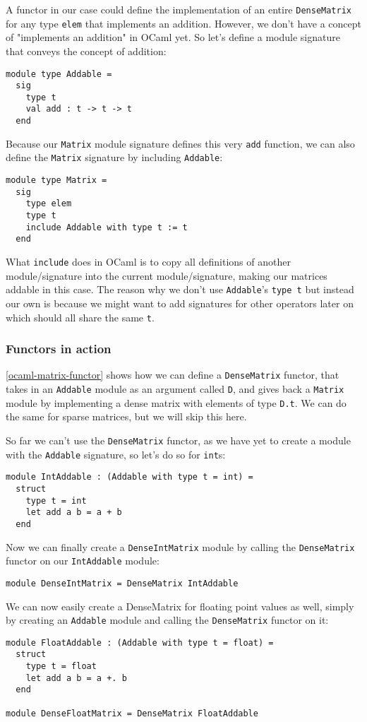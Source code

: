 A functor in our case could define the implementation of an entire \verb|DenseMatrix| for any type \verb|elem| that implements an addition. However, we don't have a concept of "implements an addition" in OCaml yet. So let's define a module signature that conveys the concept of addition:
\begin{verbatim}
module type Addable =
  sig
    type t
    val add : t -> t -> t
  end
\end{verbatim}
Because our \verb|Matrix| module signature defines this very \verb|add| function, we can also define the \verb|Matrix| signature by including \verb|Addable|:
\begin{verbatim}
module type Matrix =
  sig
    type elem
    type t
    include Addable with type t := t
  end
\end{verbatim}
What \verb|include| does in OCaml is to copy all definitions of another module/signature into the current module/signature, making our matrices addable in this case. The reason why we don't use \verb|Addable|'s \verb|type t| but instead our own is because we might want to add signatures for other operators later on which should all share the same \verb|t|.

\subsubsection{Functors in action}

\autoref{ocaml-matrix-functor} shows how we can define a \verb|DenseMatrix| functor, that takes in an \verb|Addable| module as an argument called \verb|D|, and gives back a \verb|Matrix| module by implementing a dense matrix with elements of type \verb|D.t|. We can do the same for sparse matrices, but we will skip this here.

So far we can't use the \verb|DenseMatrix| functor, as we have yet to create a module with the \verb|Addable| signature, so let's do so for \verb|int|s:
\begin{verbatim}
module IntAddable : (Addable with type t = int) =
  struct
    type t = int
    let add a b = a + b
  end
\end{verbatim}

Now we can finally create a \verb|DenseIntMatrix| module by calling the \verb|DenseMatrix| functor on our \verb|IntAddable| module:
\begin{verbatim}
module DenseIntMatrix = DenseMatrix IntAddable
\end{verbatim}

We can now easily create a DenseMatrix for floating point values as well, simply by creating an \verb|Addable| module and calling the \verb|DenseMatrix| functor on it:
\begin{verbatim}
module FloatAddable : (Addable with type t = float) =
  struct
    type t = float
    let add a b = a +. b
  end

module DenseFloatMatrix = DenseMatrix FloatAddable
\end{verbatim}
